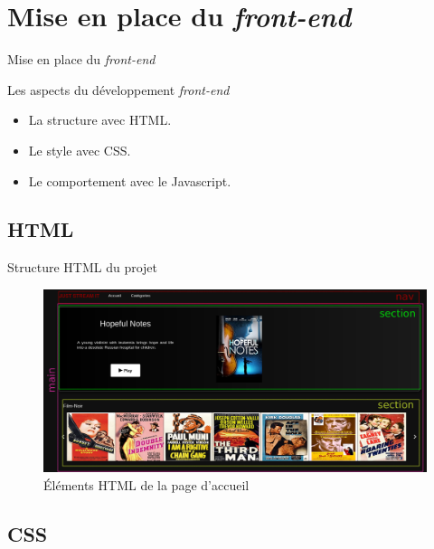 \section{Mise en place du \textit{front-end}}

\begin{frame}{Mise en place du \textit{front-end}}
  \begin{block}{Les aspects du développement \textit{front-end}}
    \begin{itemize}
    \item La structure avec HTML.
    \item Le style avec CSS.
    \item Le comportement avec le Javascript.
    \end{itemize}
  \end{block}
\end{frame}

\subsection{HTML}
\begin{frame}{Structure HTML du projet}
  \begin{figure}
    \begin{center}
      \includegraphics[scale=0.15]{img/html.png}
    \end{center}
    \caption{Éléments HTML de la page d'accueil}
  \end{figure}
\end{frame}

\subsection{CSS}

